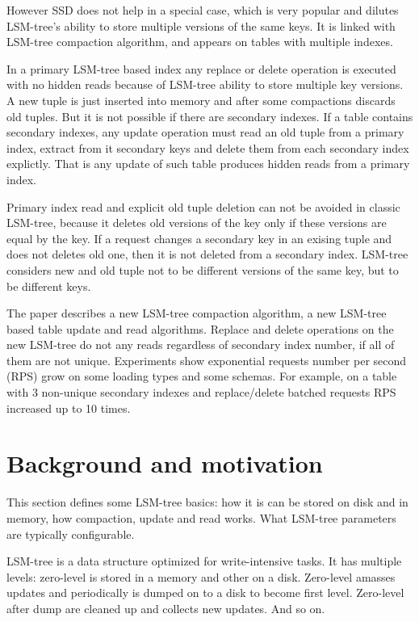\documentclass{vldb}
\begin{document}
However SSD does not help in a special case, which is very popular and dilutes
LSM-tree's ability to store multiple versions of the same keys. It is linked
with LSM-tree compaction algorithm, and appears on tables with multiple indexes.

In a primary LSM-tree based index any replace or delete operation is executed
with no hidden reads because of LSM-tree ability to store multiple key versions.
A new tuple is just inserted into memory and after some compactions discards old
tuples. But it is not possible if there are secondary indexes. If a table
contains secondary indexes, any update operation must read an old tuple from a
primary index, extract from it secondary keys and delete them from each
secondary index explictly. That is any update of such table produces hidden
reads from a primary index.

Primary index read and explicit old tuple deletion can not be avoided in classic
LSM-tree, because it deletes old versions of the key only if these versions are
equal by the key. If a request changes a secondary key in an exising tuple and
does not deletes old one, then it is not deleted from a secondary index.
LSM-tree considers new and old tuple not to be different versions of the same
key, but to be different keys.

The paper describes a new LSM-tree compaction algorithm, a new LSM-tree based
table update and read algorithms. Replace and delete operations on the new
LSM-tree do not any reads regardless of secondary index number, if all of them
are not unique. Experiments show exponential requests number per second (RPS)
grow on some loading types and some schemas. For example, on a table with 3
non-unique secondary indexes and replace/delete batched requests RPS increased
up to 10 times.

\section{Background and motivation}
This section defines some LSM-tree basics: how it is can be stored on disk and
in memory, how compaction, update and read works. What LSM-tree parameters are
typically configurable.

LSM-tree is a data structure optimized for write-intensive tasks. It has
multiple levels: zero-level is stored in a memory and other on a disk.
Zero-level amasses updates and periodically is dumped on to a disk to become
first level. Zero-level after dump are cleaned up and collects new updates. And
so on.
\end{document}
